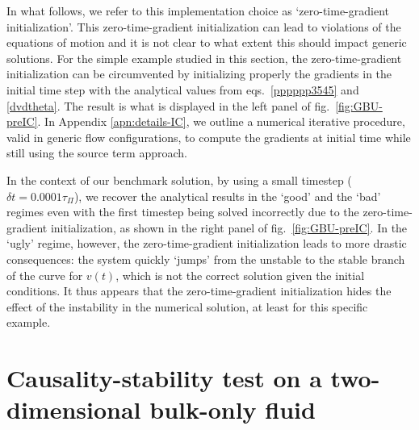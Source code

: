 \documentclass[aps, prd, showkeys,superscriptaddress, nofootinbib,floatfix]{revtex4-2}
\begin{document}
	In what follows, we refer to this implementation choice as `zero-time-gradient initialization'.
	This zero-time-gradient initialization can lead to violations of the equations of motion and it is not clear to what extent this should impact generic solutions.  
	For the simple example studied in this section, the zero-time-gradient initialization can be circumvented by initializing properly the gradients in the initial time step with the analytical values from eqs.~\eqref{pppppp3545} and \eqref{dvdtheta}. The result is what is displayed in the left panel of fig.~\ref{fig:GBU-preIC}. 
	In Appendix \ref{apn:details-IC}, we outline a numerical iterative procedure, valid in generic flow configurations, to compute the gradients at initial time while still using the source term approach. 
	
	In the context of our benchmark solution, by using a small timestep ($\delta t = 0.0001 \tau_{\Pi}$), we recover the analytical results in the `good' and the `bad' regimes even with the first timestep being solved incorrectly due to the zero-time-gradient initialization, as shown in the right panel of fig.~\ref{fig:GBU-preIC}. 
	In the `ugly' regime, however, the zero-time-gradient initialization leads to more drastic consequences: the system quickly `jumps' from the unstable to the stable branch of the curve for $v(t)$, which is not the correct solution given the initial conditions. It thus appears that the zero-time-gradient initialization hides the effect of the instability in the numerical solution, at least for this specific example.
	



\section{Causality-stability test on a two-dimensional bulk-only fluid}
\label{eq:GBU-test-2D}
\end{document}
